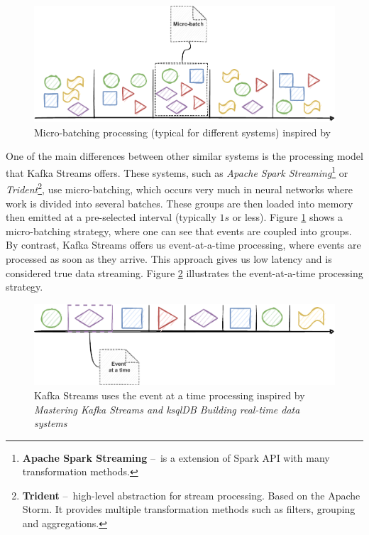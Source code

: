 \begin{figure}[!ht]
    \centering
    \includegraphics[scale=0.78]{obrazky-figures/02-preliminaries/02-kafka/10-kafkaStreamsProces.pdf}
    \caption{Micro-batching processing (typical for different systems) inspired by \cite{kafkaStreamsBook}}
    \label{fig:02-kafkaStreamsProcessingBatch}
\end{figure}

One of the main differences between other similar systems is the processing model that Kafka Streams offers. These systems, such as \emph{Apache Spark Streaming}\footnote{\textbf{Apache Spark Streaming} \---\ is a extension of Spark API with many transformation methods.} or \emph{Trident}\footnote{\textbf{Trident} \---\ high-level abstraction for stream processing. Based on the Apache Storm. It provides multiple transformation methods such as filters, grouping and aggregations.}, use micro-batching, which occurs very much in neural networks where work is divided into several batches. These groups are then loaded into memory then emitted at a pre-selected interval (typically $1s$ or less). Figure \ref{fig:02-kafkaStreamsProcessingBatch} shows a micro-batching strategy, where one can see that events are coupled into groups. By contrast, Kafka Streams offers us event-at-a-time processing, where events are processed as soon as they arrive. This approach gives us low latency and is considered true data streaming. Figure \ref{fig:02-kafkaStreamsProcessingEvent} illustrates the event-at-a-time processing strategy.
\begin{figure}[!ht]
    \centering
    \includegraphics[scale=0.88]{obrazky-figures/02-preliminaries/02-kafka/11-kafkaStreamsProces2.pdf}
    \caption{Kafka Streams uses the event at a time processing inspired by \emph{Mastering Kafka Streams and ksqlDB Building real-time data systems} \cite{kafkaStreamsBook}}
    \label{fig:02-kafkaStreamsProcessingEvent}
\end{figure}

